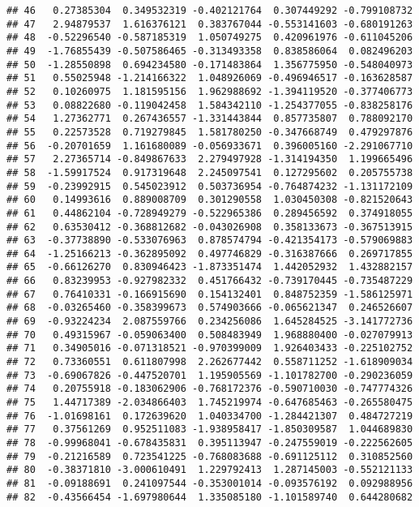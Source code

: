 \documentclass[
]{article}
\begin{document}
\begin{verbatim}
## 46   0.27385304  0.349532319 -0.402121764  0.307449292 -0.799108732
## 47   2.94879537  1.616376121  0.383767044 -0.553141603 -0.680191263
## 48  -0.52296540 -0.587185319  1.050749275  0.420961976 -0.611045206
## 49  -1.76855439 -0.507586465 -0.313493358  0.838586064  0.082496203
## 50  -1.28550898  0.694234580 -0.171483864  1.356775950 -0.548040973
## 51   0.55025948 -1.214166322  1.048926069 -0.496946517 -0.163628587
## 52   0.10260975  1.181595156  1.962988692 -1.394119520 -0.377406773
## 53   0.08822680 -0.119042458  1.584342110 -1.254377055 -0.838258176
## 54   1.27362771  0.267436557 -1.331443844  0.857735807  0.788092170
## 55   0.22573528  0.719279845  1.581780250 -0.347668749  0.479297876
## 56  -0.20701659  1.161680089 -0.056933671  0.396005160 -2.291067710
## 57   2.27365714 -0.849867633  2.279497928 -1.314194350  1.199665496
## 58  -1.59917524  0.917319648  2.245097541  0.127295602  0.205755738
## 59  -0.23992915  0.545023912  0.503736954 -0.764874232 -1.131172109
## 60   0.14993616  0.889008709  0.301290558  1.030450308 -0.821520643
## 61   0.44862104 -0.728949279 -0.522965386  0.289456592  0.374918055
## 62   0.63530412 -0.368812682 -0.043026908  0.358133673 -0.367513915
## 63  -0.37738890 -0.533076963  0.878574794 -0.421354173 -0.579069883
## 64  -1.25166213 -0.362895092  0.497746829 -0.316387666  0.269717855
## 65  -0.66126270  0.830946423 -1.873351474  1.442052932  1.432882157
## 66   0.83239953 -0.927982332  0.451766432 -0.739170445 -0.735487229
## 67   0.76410331 -0.166915690  0.154132401  0.848752359 -1.586125971
## 68  -0.03265460 -0.358399673  0.574903666 -0.065621347  0.246526607
## 69  -0.93224234  2.087559766  0.234256086  1.645284525 -3.141772736
## 70   0.49315967 -0.059063400  0.508483949  1.968880400 -0.027079913
## 71   0.34905016 -0.071318521 -0.970399009  1.926403433 -0.225102752
## 72   0.73360551  0.611807998  2.262677442  0.558711252 -1.618909034
## 73  -0.69067826 -0.447520701  1.195905569 -1.101782700 -0.290236059
## 74   0.20755918 -0.183062906 -0.768172376 -0.590710030 -0.747774326
## 75   1.44717389 -2.034866403  1.745219974 -0.647685463 -0.265580475
## 76  -1.01698161  0.172639620  1.040334700 -1.284421307  0.484727219
## 77   0.37561269  0.952511083 -1.938958417 -1.850309587  1.044689830
## 78  -0.99968041 -0.678435831  0.395113947 -0.247559019 -0.222562605
## 79  -0.21216589  0.723541225 -0.768083688 -0.691125112  0.310852560
## 80  -0.38371810 -3.000610491  1.229792413  1.287145003 -0.552121133
## 81  -0.09188691  0.241097544 -0.353001014 -0.093576192  0.092988956
## 82  -0.43566454 -1.697980644  1.335085180 -1.101589740  0.644280682

\end{verbatim}
\end{document}
